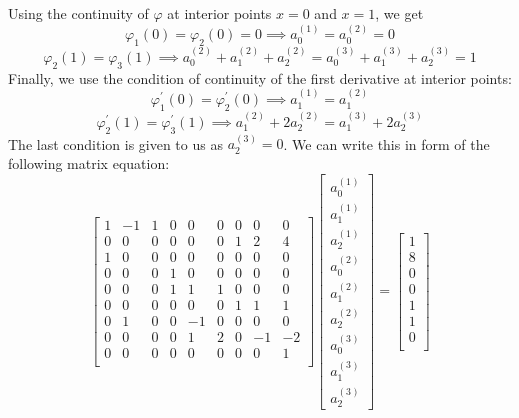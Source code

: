 \documentclass[a4paper, 11pt]{article}
\begin{document}
\begin{enumerate}[label=(\arabic*), leftmargin=*]
	Using the continuity of $\varphi$ at interior points $x=0$ and $x=1$, we get
	\vspace{-2.5mm}
	$$\varphi_1(0)=\varphi_2(0)=0\implies a_0^{(1)}= a_0^{(2)}=0$$
	\vspace{-8.5mm}
	$$\varphi_2(1)=\varphi_3(1)\implies a_0^{(2)}+a_1^{(2)}+a_2^{(2)}=a_0^{(3)}+a_1^{(3)}+a_2^{(3)}=1$$
	Finally, we use the condition of continuity of the first derivative at interior points:
	\vspace{-2.5mm}
	$$\varphi_1^{\prime}(0)=\varphi_2^{\prime}(0)\implies a_1^{(1)}= a_1^{(2)}$$
	\vspace{-8.5mm}
	$$\varphi_2^{\prime}(1)=\varphi_3^{\prime}(1)\implies a_1^{(2)}+2a_2^{(2)}=a_1^{(3)}+2a_2^{(3)}$$
	\newpage
	The last condition is given to us as $a_2^{(3)}=0$. We can write this in form of the following matrix equation:
	$$\begin{bmatrix}
		1 & -1 & 1 & 0 & 0 & 0 & 0 & 0 & 0 \\
		0 & 0 & 0 & 0 & 0 & 0 & 1 & 2 & 4 \\
		1 & 0 & 0 & 0 & 0 & 0 & 0 & 0 & 0 \\
		0 & 0 & 0 & 1 & 0 & 0 & 0 & 0 & 0 \\
		0 & 0 & 0 & 1 & 1 & 1 & 0 & 0 & 0 \\
		0 & 0 & 0 & 0 & 0 & 0 & 1 & 1 & 1 \\
		0 & 1 & 0 & 0 & -1 & 0 & 0 & 0 & 0 \\
		0 & 0 & 0 & 0 & 1 & 2 & 0 & -1 & -2 \\
		0 & 0 & 0 & 0 & 0 & 0 & 0 & 0 & 1 \\
	\end{bmatrix}\begin{bmatrix}
		a_0^{(1)}\\ a_1^{(1)}\\ a_2^{(1)}\\ a_0^{(2)}\\ a_1^{(2)}\\ a_2^{(2)}\\ a_0^{(3)}\\ a_1^{(3)}\\ a_2^{(3)}
	\end{bmatrix}=\begin{bmatrix}
		1\\
		8\\
		0\\
		0\\
		1\\
		1\\
		0\\

\end{bmatrix}$$
\end{enumerate}
\end{document}
